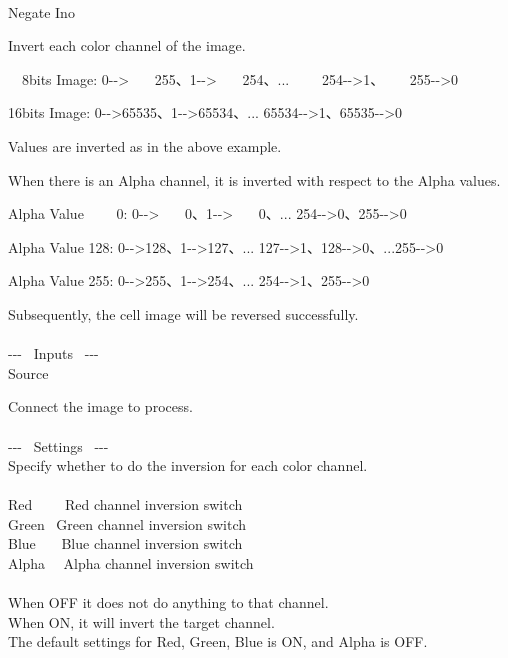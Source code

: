 \documentclass[a4paper,12pt]{article}
\begin{document}
\thispagestyle{empty}

\Large
\noindent \\
Negate Ino\medskip
\par
\normalsize
Invert each color channel of the image.\\
\par
\ \ 8bits Image: 0-{-}> \ \ \ 255、1-{-}> \ \ \, 254、... \ \ \ \ 254-{-}>1、 \ \ \, 255-{-}>0\par
16bits Image: 0-{-}>65535、1-{-}>65534、... 65534-{-}>1、65535-{-}>0\par
Values are inverted as in the above example.\\
\par
When there is an Alpha channel, it is inverted with respect to the Alpha values.\par
Alpha Value \ \ \ \ 0: 0-{-}> \ \ \, 0、1-{-}> \ \ \ 0、... 254-{-}>0、255-{-}>0\par
Alpha Value 128: 0-{-}>128、1-{-}>127、... 127-{-}>1、128-{-}>0、...255-{-}>0\par
Alpha Value 255: 0-{-}>255、1-{-}>254、... 254-{-}>1、255-{-}>0\par
Subsequently, the cell image will be reversed successfully.\\
\\
-{-}- \ Inputs \ -{-}-\\
Source\par
Connect the image to process.\\
\\
-{-}- \ Settings \ -{-}-\\
Specify whether to do the inversion for each color channel.\\
\\
Red \ \ \ \, Red channel inversion switch\\
Green \ Green channel inversion switch\\
Blue \ \ \, Blue channel inversion switch\\
Alpha \ \ Alpha channel inversion switch\\
\\
When OFF it does not do anything to that channel.\\
When ON, it will invert the target channel.\\
The default settings for Red, Green, Blue is ON, and Alpha is OFF.
\end{document}
